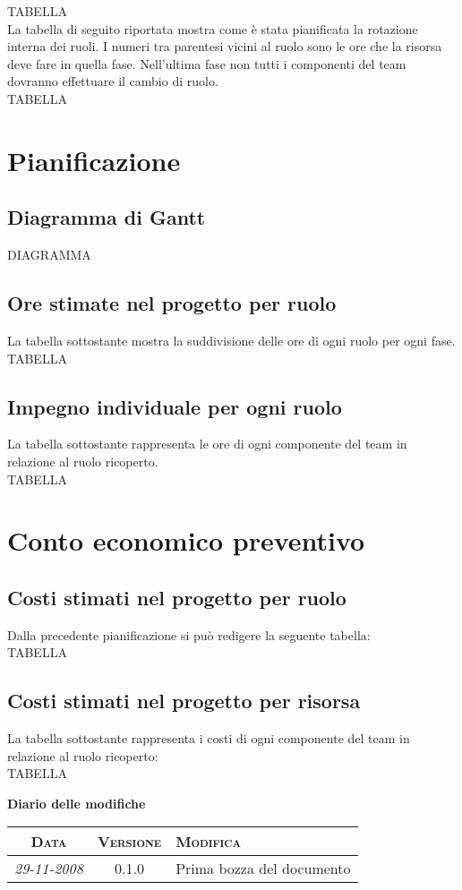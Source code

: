\documentclass[11pt,a4paper]{article}
\newcommand{\modifiche} 
{
\newpage
\begin{center}
\textbf{Diario delle modifiche} \\
\bigskip
\begin{tabular}{|c|c|p{0.69\textwidth}|}
\hline
\textsc{Data} & \textsc{Versione} & \textsc{Modifica} \\
\hline
\hline
\textit{29-11-2008} & 0.1.0 & Prima bozza del documento \\
\hline
\end{tabular}
\end{center}
}
\begin{document}
TABELLA\\

La tabella di seguito riportata mostra come è stata pianificata la rotazione interna dei ruoli.
I numeri tra parentesi vicini al ruolo sono le ore che la risorsa deve fare in quella fase.
Nell’ultima fase non tutti i componenti del team dovranno effettuare il cambio di ruolo.\\

TABELLA

\section{Pianificazione}
\subsection{Diagramma di Gantt}

DIAGRAMMA

\subsection{Ore stimate nel progetto per ruolo}
La tabella sottostante mostra la suddivisione delle ore di ogni ruolo per ogni fase.\\

TABELLA

\subsection{Impegno individuale per ogni ruolo}
La tabella sottostante rappresenta le ore di ogni componente del team in relazione al ruolo ricoperto.\\

TABELLA

\section{Conto economico preventivo}
\subsection{Costi stimati nel progetto per ruolo}
Dalla precedente pianificazione si può redigere la seguente tabella:\\

TABELLA

\subsection{Costi stimati nel progetto per risorsa}
La tabella sottostante rappresenta i costi di ogni componente del team in relazione al ruolo ricoperto:\\

TABELLA

\modifiche
\end{document}
